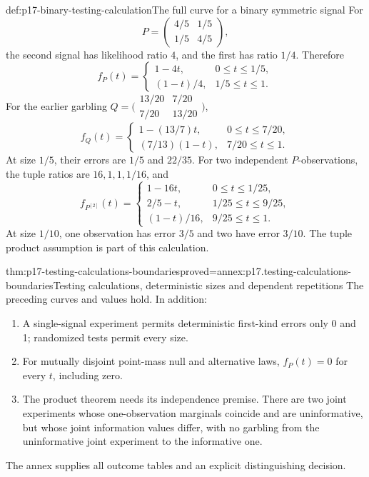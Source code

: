 \begin{hbexample}{def:p17-binary-testing-calculation}{The full curve for a binary symmetric signal}
For
\[
                  P=\begin{pmatrix}4/5&1/5\\1/5&4/5\end{pmatrix},
\]
the second signal has likelihood ratio \(4\), and the first has ratio
\(1/4\). Therefore
\[
 f_P(t)=
 \begin{cases}
  1-4t,&0\leq t\leq1/5,\\
  (1-t)/4,&1/5\leq t\leq1.
 \end{cases}
\]
For the earlier garbling
\(Q=\bigl(\begin{smallmatrix}13/20&7/20\\7/20&13/20\end{smallmatrix}\bigr)\),
\[
 f_Q(t)=
 \begin{cases}
  1-(13/7)t,&0\leq t\leq7/20,\\
  (7/13)(1-t),&7/20\leq t\leq1.
 \end{cases}
\]
At size \(1/5\), their errors are \(1/5\) and \(22/35\).
For two independent \(P\)-observations, the tuple ratios are
\(16,1,1,1/16\), and
\[
 f_{P^{[2]}}(t)=
 \begin{cases}
  1-16t,&0\leq t\leq1/25,\\
  2/5-t,&1/25\leq t\leq9/25,\\
  (1-t)/16,&9/25\leq t\leq1.
 \end{cases}
\]
At size \(1/10\), one observation has error \(3/5\) and two have error
\(3/10\). The tuple product assumption is part of this calculation.
\end{hbexample}

\begin{hbtheorem}{thm:p17-testing-calculations-boundaries}{proved=annex:p17.testing-calculations-boundaries}{Testing calculations, deterministic sizes and dependent repetitions}
The preceding curves and values hold. In addition:
\begin{enumerate}
\item A single-signal experiment permits deterministic first-kind errors
      only 0 and 1; randomized tests permit every size.
\item For mutually disjoint point-mass null and alternative laws,
      \(f_P(t)=0\) for every \(t\), including zero.
\item The product theorem needs its independence premise. There are two
      joint experiments whose one-observation marginals coincide and are
      uninformative, but whose joint information values differ, with no
      garbling from the uninformative joint experiment to the informative one.
\end{enumerate}
The annex supplies all outcome tables and an explicit distinguishing decision.
\end{hbtheorem}

